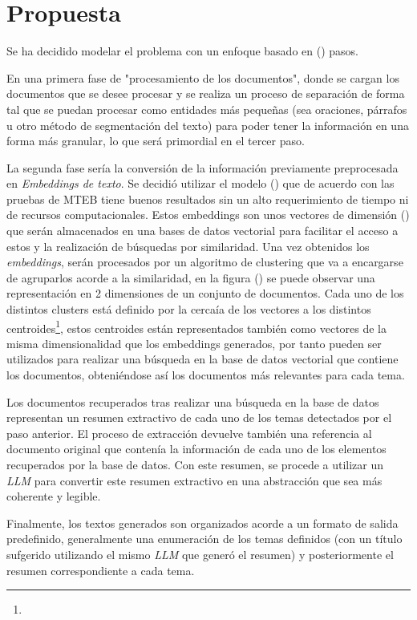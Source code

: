 \chapter{Propuesta}\label{chapter:proposal}
    Se ha decidido modelar el problema con un enfoque basado en () pasos.

    En una primera fase de "procesamiento de los documentos", donde se cargan los documentos que se desee procesar y se realiza un proceso de separación de forma tal que se puedan procesar como entidades más pequeñas (sea oraciones, párrafos u otro método de segmentación del texto) para poder tener la información en una forma más granular, lo que será primordial en el tercer paso.
    
    La segunda fase sería la conversión de la información previamente preprocesada en \emph{Embeddings de texto}. Se decidió utilizar el modelo () que de acuerdo con las pruebas de MTEB\cite{leaderboard} tiene buenos resultados sin un alto requerimiento de tiempo ni de recursos computacionales. Estos embeddings son unos vectores de dimensión () que serán almacenados en una bases de datos vectorial para facilitar el acceso a estos y la realización de búsquedas por similaridad.
    Una vez obtenidos los \emph{embeddings}, serán procesados por un algoritmo de clustering que va a encargarse de agruparlos acorde a la similaridad, en la figura () se puede observar una representación en 2 dimensiones de un conjunto de documentos. Cada uno de los distintos clusters está definido por la cercaía de los vectores a los distintos centroides\footnote{}, estos centroides están representados también como vectores de la misma dimensionalidad que los embeddings generados, por tanto pueden ser utilizados para realizar una búsqueda en la base de datos vectorial que contiene los documentos, obteniéndose así los documentos más relevantes para cada tema.

    Los documentos recuperados tras realizar una búsqueda en la base de datos representan un resumen extractivo de cada uno de los temas detectados por el paso anterior. El proceso de extracción devuelve también una referencia al documento original que contenía la información de cada uno de los elementos recuperados por la base de datos. Con este resumen, se procede a utilizar un \emph{LLM} para convertir este resumen extractivo en una abstracción que sea más coherente y legible.

    Finalmente, los textos generados son organizados acorde a un formato de salida predefinido, generalmente una enumeración de los temas definidos (con un título sufgerido utilizando el mismo \emph{LLM} que generó el resumen) y posteriormente el resumen correspondiente a cada tema.
